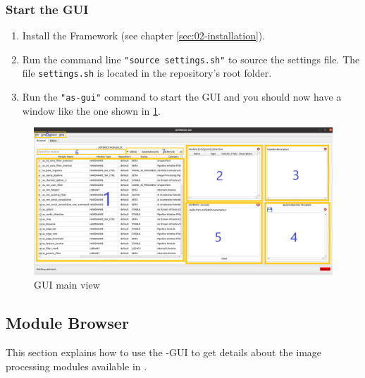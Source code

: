 	
	\subsubsection*{Start the GUI}
	\begin{enumerate}
		\item Install the \asterics Framework (see chapter \ref{sec:02-installation}).
		\item Run the command line \texttt{"source settings.sh"} to source the \asterics settings file. The file \texttt{settings.sh} is located in the repository's root folder.
		\item Run the \texttt{"as-gui"} command to start the GUI and you should now have a window like the one shown in \ref{fig:GuiMainView}.
	\end{enumerate}

		\begin{figure}[!ht]
		\includegraphics[width=\textwidth]{figs/gui/modulBrowser}
		\caption{GUI main view}
		\label{fig:GuiMainView}
	\end{figure}

	\subsection{Module Browser}
		\label{sec:06-05-modullist}
	This section explains how to use the \asterics-GUI to get details about the image processing modules available in \asterics.
	

